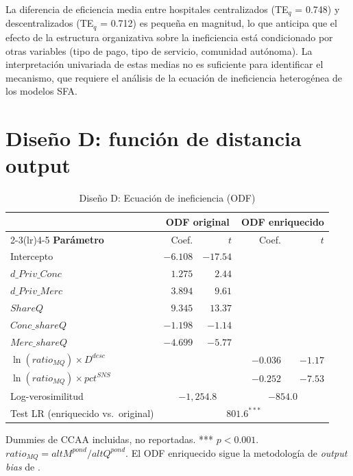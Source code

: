 \documentclass[12pt, a4paper, twoside, openright]{book}
\theoremstyle{plain}
\theoremstyle{definition}
\theoremstyle{remark}
\begin{document}
La diferencia de eficiencia media entre hospitales centralizados (TE$_q$ = 0.748) y descentralizados (TE$_q$ = 0.712) es pequeña en magnitud, lo que anticipa que el efecto de la estructura organizativa sobre la ineficiencia está condicionado por otras variables (tipo de pago, tipo de servicio, comunidad autónoma). La interpretación univariada de estas medias no es suficiente para identificar el mecanismo, que requiere el análisis de la ecuación de ineficiencia heterogénea de los modelos SFA.


\section{Diseño D: función de distancia output}

\begin{table}[htbp]
\centering
\caption{Diseño D: Ecuación de ineficiencia (ODF)}
\label{tab:odf}
\begin{threeparttable}
\begin{tabular}{lrrrr}
\toprule
& \multicolumn{2}{c}{\textbf{ODF original}}
& \multicolumn{2}{c}{\textbf{ODF enriquecido}} \\
\cmidrule(lr){2-3}\cmidrule(lr){4-5}
\textbf{Parámetro} & Coef. & $t$ & Coef. & $t$ \\
\midrule
Intercepto & $-6.108$ & $-17.54$ & & \\
$d\_Priv\_Conc$ & $1.275$ & $2.44$ & & \\
$d\_Priv\_Merc$ & $3.894$ & $9.61$ & & \\
$ShareQ$ & $9.345$ & $13.37$ & & \\
$Conc\_shareQ$ & $-1.198$ & $-1.14$ & & \\
$Merc\_shareQ$ & $-4.699$ & $-5.77$ & & \\
$\ln(ratio_{MQ}) \times D^{desc}$ & & & $-0.036$ & $-1.17$ \\
$\ln(ratio_{MQ}) \times pct^{SNS}$ & & & $-0.252$ & $-7.53$ \\
\midrule
Log-verosimilitud & \multicolumn{2}{c}{$-1{,}254.8$}
  & \multicolumn{2}{c}{$-854.0$} \\
Test LR (enriquecido vs.\ original) & \multicolumn{4}{c}{$801.6^{***}$} \\
\bottomrule
\end{tabular}
\begin{tablenotes}
  \small
  \item Dummies de CCAA incluidas, no reportadas. *** $p<0.001$. $ratio_{MQ} = altM^{pond}/altQ^{pond}$. El ODF enriquecido sigue la metodología de \textit{output bias} de \citet{kumbhakar2015}.
\end{tablenotes}
\end{threeparttable}
\end{table}
\end{document}
